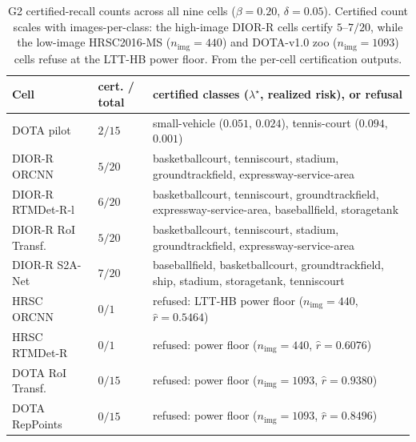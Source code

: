 \documentclass[journal]{IEEEtran}
\begin{document}
\begin{table}[!t]\centering\small
\caption{G2 certified-recall counts across all nine cells ($\beta{=}0.20$, $\delta{=}0.05$). Certified count
scales with images-per-class: the high-image DIOR-R cells certify $5$--$7/20$, while the low-image
HRSC2016-MS ($n_{\mathrm{img}}{=}440$) and DOTA-v1.0 zoo ($n_{\mathrm{img}}{=}1093$) cells refuse at the
LTT-HB power floor. From the per-cell certification outputs.}\label{tab:g2}
\begin{tabular}{ll>{\raggedright\arraybackslash}p{}}
\toprule
Cell & cert. / total & certified classes ($\lambda^\star$, realized risk), or refusal \\
\midrule
DOTA pilot           & $2/15$ & small-vehicle ($0.051$, $0.024$), tennis-court ($0.094$, $0.001$) \\
DIOR-R ORCNN         & $5/20$ & basketballcourt, tenniscourt, stadium, groundtrackfield, expressway-service-area \\
DIOR-R RTMDet-R-l    & $6/20$ & basketballcourt, tenniscourt, groundtrackfield, expressway-service-area, baseballfield, storagetank \\
DIOR-R RoI Transf.   & $5/20$ & basketballcourt, tenniscourt, stadium, groundtrackfield, expressway-service-area \\
DIOR-R S2A-Net       & $7/20$ & baseballfield, basketballcourt, groundtrackfield, ship, stadium, storagetank, tenniscourt \\
HRSC ORCNN           & $0/1$  & refused: LTT-HB power floor ($n_{\mathrm{img}}{=}440$, $\hat r{=}0.5464$) \\
HRSC RTMDet-R        & $0/1$  & refused: power floor ($n_{\mathrm{img}}{=}440$, $\hat r{=}0.6076$) \\
DOTA RoI Transf.     & $0/15$ & refused: power floor ($n_{\mathrm{img}}{=}1093$, $\hat r{=}0.9380$) \\
DOTA RepPoints       & $0/15$ & refused: power floor ($n_{\mathrm{img}}{=}1093$, $\hat r{=}0.8496$) \\
\bottomrule
\end{tabular}
\end{table}
\end{document}
